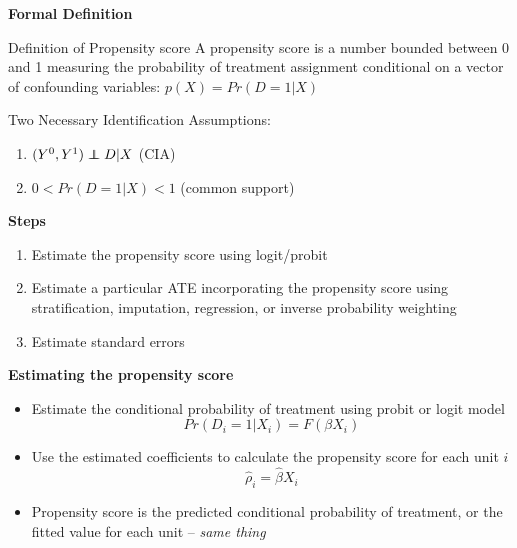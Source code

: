 \documentclass[notes=show]{beamer}
\newcommand\independent{\protect\mathpalette{\protect\independenT}{\perp}}
\def\independenT#1#2{\mathrel{\rlap{$#1#2$}\mkern2mu{#1#2}}}
\begin{document}
\begin{frame}[plain]
	\begin{center}
	\textbf{Formal Definition}
	\end{center}
	
	\begin{block}{Definition of Propensity score}
	A propensity score is a number bounded between 0 and 1 measuring the probability of treatment assignment conditional on a vector of confounding variables: $p(X)=Pr(D=1 | X)$
	\end{block}
	
	Two Necessary Identification Assumptions:
	\begin{enumerate}
	\item $(Y^0,Y^1) \independent{D}|X$ (CIA)
	\item $0<Pr(D=1|X)<1$ (common support)
	\end{enumerate}

\end{frame}


\begin{frame}[plain]
	\begin{center}
	\textbf{Steps}
	\end{center}
	
		\begin{enumerate}
		\item Estimate the propensity score using logit/probit
		\item Estimate a particular ATE incorporating the propensity score using stratification, imputation, regression, or inverse probability weighting
		\item Estimate standard errors
		\end{enumerate}
\end{frame}

\begin{frame}[plain]
\begin{center}
\textbf{Estimating the propensity score}
\end{center}

		\begin{itemize}
		\item Estimate the conditional probability of treatment using probit or logit model$$Pr(D_i=1|X_i) = F(\beta X_i)$$
		\item Use the estimated coefficients to calculate the propensity score for each unit $i$$$\widehat{\rho}_i = \widehat{\beta} X_i$$
		\item Propensity score is the predicted conditional probability of treatment, or the fitted value for each unit -- \emph{same thing}
		\end{itemize}
\end{frame}
\end{document}
